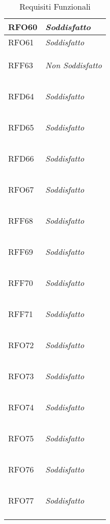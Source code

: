 \begin{longtable}{|>{\centering}m{5cm}|m{5cm}<{\centering}|}
    \hypertarget{RFO60}{RFO60} & \textit{Soddisfatto}\\ \hline
   
    \hypertarget{RFO61}{RFO61} & \textit{Soddisfatto}\\ \hline
   
    \hypertarget{RFF63}{RFF63} & \textit{Non Soddisfatto}\\ \hline
   
    \hypertarget{RFD64}{RFD64} & \textit{Soddisfatto}\\ \hline
   
    \hypertarget{RFD65}{RFD65} & \textit{Soddisfatto}\\ \hline
   
    \hypertarget{RFD66}{RFD66} & \textit{Soddisfatto}\\ \hline
   
    \hypertarget{RFO67}{RFO67} & \textit{Soddisfatto}\\ \hline
   
    \hypertarget{RFF68}{RFF68} & \textit{Soddisfatto}\\ \hline
   
    \hypertarget{RFF69}{RFF69} & \textit{Soddisfatto}\\ \hline
   
    \hypertarget{RFF70}{RFF70} & \textit{Soddisfatto}\\ \hline
   
    \hypertarget{RFF71}{RFF71} & \textit{Soddisfatto}\\ \hline
   
    \hypertarget{RFO72}{RFO72} & \textit{Soddisfatto}\\ \hline
   
    \hypertarget{RFO73}{RFO73} & \textit{Soddisfatto}\\ \hline
   
    \hypertarget{RFO74}{RFO74} & \textit{Soddisfatto}\\ \hline
   
    \hypertarget{RFO75}{RFO75} & \textit{Soddisfatto}\\ \hline
   
    \hypertarget{RFO76}{RFO76} & \textit{Soddisfatto}\\ \hline
   
    \hypertarget{RFO77}{RFO77} & \textit{Soddisfatto}\\ \hline
   
    \caption[Requisiti Funzionali]{Requisiti Funzionali}
    \label{tabella:req0}
\end{longtable}
\clearpage

